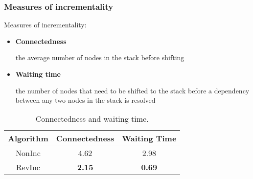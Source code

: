 \documentclass[10pt]{beamer}
\begin{document}
\begin{frame}
    \frametitle{Measures of incrementality}
    Measures of incrementality:
    \begin{itemize}
        \item \textbf{Connectedness}

            the average number of nodes in the stack before shifting

        \item \textbf{Waiting time}

            the number of nodes that need to be shifted to the stack
            before a dependency between any two nodes in the stack is resolved
    \end{itemize}

    \smallskip

    \begin{center}
        \begin{table}
        \caption{Connectedness and waiting time.}
        \begin{tabular}{ccc}
            \toprule
            Algorithm  & Connectedness & Waiting Time  \\
            \midrule
            NonInc     & 4.62          & 2.98          \\
            RevInc     & \textbf{2.15} & \textbf{0.69} \\
            \bottomrule
        \end{tabular}
        \end{table}
    \end{center}
\end{frame}
\end{document}
